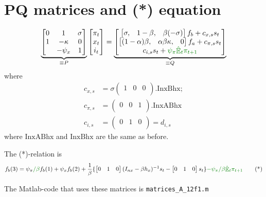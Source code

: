 \documentclass[11pt]{article}
\renewcommand{\[}{\begin{equation}}
\renewcommand{\]}{\end{equation}}
\DeclareMathOperator{\E}{\mathbb{E}}
\begin{document}
\section{PQ matrices and (*) equation}
\begin{equation}
\underbrace{\begin{bmatrix} 0& 1&  \sigma \\ 1& -\kappa & 0 \\ & -\psi_{x} & 1 \end{bmatrix}}_{\equiv P}\begin{bmatrix} \pi_t \\ x_t \\i_t \end{bmatrix} = \underbrace{\begin{bmatrix} \begin{bmatrix}\sigma, &1-\beta, &\beta  (-\sigma )\end{bmatrix}f_b +c_{x,s} s_t \\ \begin{bmatrix}(1-\alpha ) \beta ,&\alpha  \beta  \kappa ,&0\end{bmatrix}f_a +c_{\pi,s} s_t \\ c_{i,s} s_t + \textcolor{mygreen}{\psi_{\pi}\hat{\E}_t\pi_{t+1}}\end{bmatrix}}_{\equiv Q}
\end{equation}
where 
\begin{align}
c_{x,s} & = \sigma  \left(
\begin{array}{ccc}
 1 & 0 & 0 \\
\end{array}
\right).\text{InxBhx};\\
c_{\pi,s} & = \left(
\begin{array}{ccc}
 0 & 0 & 1 \\
\end{array}
\right).\text{InxABhx}\\
c_{i,s} & = \left(
\begin{array}{ccc}
 0 & 1 & 0 \\
\end{array}
\right) = d_{i,s}
\end{align}
where $\text{InxABhx}$ and $\text{InxBhx}$ are the same as before.

The (*)-relation is
\begin{equation}
f_b(3) = \psi_{\pi}\textcolor{mygreen}{/\beta}f_b(1) + \psi_{x}f_b(2) + \frac{1}{\beta}\{ \begin{bmatrix} 0 &1 & 0  \end{bmatrix}(I_{nx}-\beta h_x)^{-1} s_t - \begin{bmatrix} 0 &1 & 0  \end{bmatrix}s_t  \} \textcolor{mygreen}{-\psi_{\pi}/\beta\hat{\E}_t\pi_{t+1}}\tag{*}
\end{equation}


The Matlab-code that uses these matrices is \texttt{matrices\_A\_12f1.m}
\end{document}
